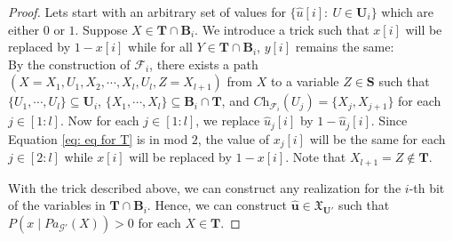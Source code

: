 \documentclass[accepted]{uai2022}
\newcommand{\Pa}[2]{\textit{Pa}_{#2}(#1)}
\newcommand{\Ch}[2]{\textit{Ch}_{#2}(#1)}
\newcommand{\U}[0]{\mathbf{U}}
\newcommand{\B}[0]{\mathbf{B}}
\newcommand{\T}[0]{\mathbf{T}}
\newcommand{\G}[0]{\mathcal{G}}
\newcommand{\F}[0]{\mathcal{F}}
\newcommand{\dom}[1]{\mathfrak{X}_{#1}}
\begin{document}
\begin{proof}
        Lets start with an arbitrary set of values for $\{\hat{u}[i]\!:\: U\in \U_i\}$ which are either $0$ or $1$. 
        Suppose $X\in \T \cap \B_i$. 
        We introduce a trick such that $x[i]$ will be replaced by $1- x[i]$ while for all $Y\in \T \cap \B_i$, $y[i]$ remains the same: \\
        By the construction of $\F_i$, there exists a path $(X=X_1, U_1, X_2, \cdots, X_l,U_l,Z = X_{l+1} )$ from $X$ to a variable $Z \in \mathbf{S}$ such that $\{U_1, \cdots, U_l\} \subseteq \U_i$, $\{X_1,\cdots,X_l\} \subseteq \B_i \cap \T$, and $\Ch{U_j}{\F_i} = \{X_j, X_{j+1}\}$ for each $j\in [1:l]$. 
        Now for each $j \in [1:l]$, we replace $\hat{u}_j[i]$ by $1-\hat{u}_j[i]$. 
        Since Equation \eqref{eq: eq for T} is in mod $2$, the value of $x_j[i]$ will be the same for each $j\in [2:l]$ while $x[i]$ will be replaced by $1-x[i]$. 
        Note that $X_{l+1}=Z \notin \T$. 
        
        With the trick described above, we can construct any realization for the $i$-th bit of the variables in $\T \cap \B_i$. 
        Hence, we can construct $\hat{\mathbf{u}}\in \dom{\U'}$ such that $P(x \mid \Pa{X}{\G'})>0$ for each $X\in \T$.
    \end{proof}
    
\end{document}
